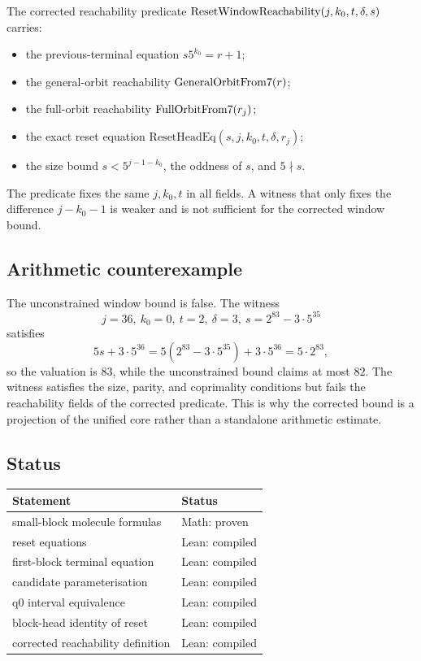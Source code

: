 The corrected reachability predicate
$\mathrm{ResetWindowReachability}(j,k_0,t,\delta,s)$ carries:
\begin{itemize}[leftmargin=*]
\item the previous-terminal equation $s5^{k_0}=r+1$;
\item the general-orbit reachability $\mathrm{GeneralOrbitFrom7}(r)$;
\item the full-orbit reachability $\mathrm{FullOrbitFrom7}(r_j)$;
\item the exact reset equation
  $\mathrm{ResetHeadEq}(s,j,k_0,t,\delta,r_j)$;
\item the size bound $s<5^{j-1-k_0}$, the oddness of $s$, and
  $5\nmid s$.
\end{itemize}
The predicate fixes the same $j,k_0,t$ in all fields.  A witness that
only fixes the difference $j-k_0-1$ is weaker and is not sufficient
for the corrected window bound.

\subsection{Arithmetic counterexample}

The unconstrained window bound is false.  The witness
\begin{equation*}
  j=36,\ k_0=0,\ t=2,\ \delta=3,\
  s=2^{83}-3\cdot5^{35}
\end{equation*}
satisfies
\begin{equation*}
  5s+3\cdot5^{36}
    =5(2^{83}-3\cdot5^{35})+3\cdot5^{36}
    =5\cdot2^{83},
\end{equation*}
so the valuation is $83$, while the unconstrained bound claims at most
$82$.  The witness satisfies the size, parity, and coprimality
conditions but fails the reachability fields of the corrected
predicate.  This is why the corrected bound is a projection of the
unified core rather than a standalone arithmetic estimate.

\subsection{Status}

\begin{center}
\small
\begin{tabular}{@{}ll@{}}
\toprule
Statement & Status \\
\midrule
small-block molecule formulas & Math: proven \\
reset equations & Lean: compiled \\
first-block terminal equation & Lean: compiled \\
candidate parameterisation & Lean: compiled \\
q0 interval equivalence & Lean: compiled \\
block-head identity of reset & Lean: compiled \\
corrected reachability definition & Lean: compiled \\
\bottomrule
\end{tabular}
\end{center}
